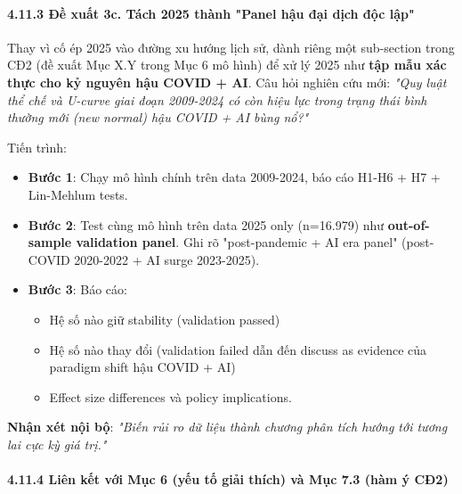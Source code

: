 \documentclass[12pt,a4paper]{article}
\providecommand{\tightlist}{\setlength{\itemsep}{0pt}\setlength{\parskip}{0pt}}
\begin{document}
\hypertarget{4113-ux111ux1ec1-xuux1ea5t-3c-tuxe1ch-2025-thuxe0nh-panel-hux1eadu-ux111ux1ea1i-dux1ecbch-ux111ux1ed9c-lux1eadp}{%
\paragraph{4.11.3 Đề xuất 3c. Tách 2025 thành "Panel hậu đại dịch độc
lập"}\label{4113-ux111ux1ec1-xuux1ea5t-3c-tuxe1ch-2025-thuxe0nh-panel-hux1eadu-ux111ux1ea1i-dux1ecbch-ux111ux1ed9c-lux1eadp}}

Thay vì cố ép 2025 vào đường xu hướng lịch sử, dành riêng một
sub-section trong CĐ2 (đề xuất Mục X.Y trong Mục 6 mô hình) để xử lý
2025 như \textbf{tập mẫu xác thực cho kỷ nguyên hậu COVID + AI}. Câu hỏi
nghiên cứu mới: \emph{"Quy luật thể chế và U-curve giai đoạn 2009-2024
có còn hiệu lực trong \textquotesingle trạng thái bình thường
mới\textquotesingle{} (new normal) hậu COVID + AI bùng nổ?"}

Tiến trình:

\begin{itemize}
\tightlist
\item
  \textbf{Bước 1}: Chạy mô hình chính trên data 2009-2024, báo cáo H1-H6
  + H7 + Lin-Mehlum tests.
\item
  \textbf{Bước 2}: Test cùng mô hình trên data 2025 only (n=16.979) như
  \textbf{out-of-sample validation panel}. Ghi rõ "post-pandemic + AI
  era panel" (post-COVID 2020-2022 + AI surge 2023-2025).
\item
  \textbf{Bước 3}: Báo cáo:

  \begin{itemize}
  \tightlist
  \item
    Hệ số nào giữ stability (validation passed)
  \item
    Hệ số nào thay đổi (validation failed dẫn đến discuss as evidence
    của paradigm shift hậu COVID + AI)
  \item
    Effect size differences và policy implications.
  \end{itemize}
\end{itemize}

\textbf{Nhận xét nội bộ}: \emph{"Biến rủi ro dữ liệu thành chương phân
tích hướng tới tương lai cực kỳ giá trị."}

\hypertarget{4114-liuxean-kux1ebft-vux1edbi-mux1ee5c-6-yux1ebfu-tux1ed1-giux1ea3i-thuxedch-vuxe0-mux1ee5c-73-huxe0m-uxfd-cux1112}{%
\paragraph{4.11.4 Liên kết với Mục 6 (yếu tố giải thích) và Mục 7.3 (hàm
ý
CĐ2)}\label{4114-liuxean-kux1ebft-vux1edbi-mux1ee5c-6-yux1ebfu-tux1ed1-giux1ea3i-thuxedch-vuxe0-mux1ee5c-73-huxe0m-uxfd-cux1112}}
\end{document}
